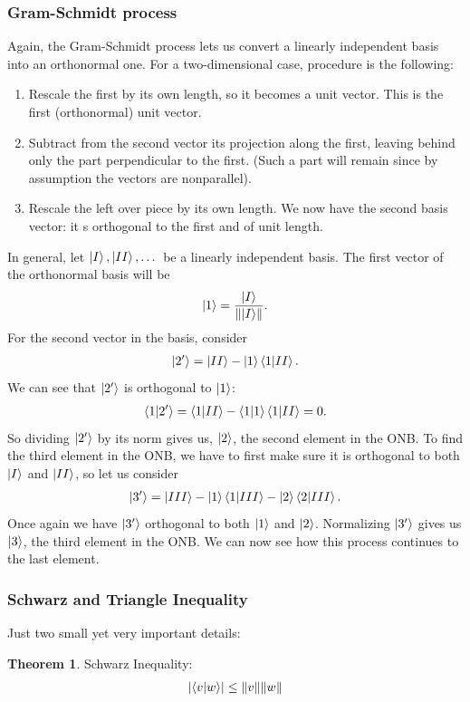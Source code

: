 \documentclass{book}
\theoremstyle{definition}
\newtheorem{thm}{Theorem}[section]
\newcommand{\f}[2]{\frac{#1}{#2}}
\begin{document}
\subsubsection{Gram-Schmidt process}
Again, the Gram-Schmidt process lets us convert a linearly independent basis into an orthonormal one. For a two-dimensional case, procedure is the following:
\begin{enumerate}
	\item Rescale the first by its own length, so it becomes a unit vector. This is the first (orthonormal) unit vector.
	\item Subtract from the second vector its projection along the first, leaving behind only the part perpendicular to the first. (Such a part will remain since by assumption the vectors are nonparallel).
	\item Rescale the left over piece by its own length. We now have the second basis vector: it s orthogonal to the first and of unit length.
\end{enumerate}

In general, let $\ket{I}, \ket{II}, \dots$ be a linearly independent basis. The first vector of the orthonormal basis will be
\begin{align}
\ket{1} = \f{\ket{I}}{\norm{\ket{I}}}.
\end{align}
For the second vector in the basis, consider
\begin{align}
\ket{2'} = \ket{II} - \ket{1}\braket{1}{II}.
\end{align}
We can see that $\ket{2'}$ is orthogonal to $\ket{1}$:
\begin{align}
\braket{1}{2'} = \braket{1}{II} - \braket{1}\braket{1}{II} = 0.
\end{align}
So dividing $\ket{2'}$ by its norm gives us, $\ket{2}$, the second element in the ONB. To find the third element in the ONB, we have to first make sure it is orthogonal to both $\ket{I}$ and $\ket{II}$, so let us consider
\begin{align}
\ket{3'}= \ket{III} - \ket{1}\braket{1}{III} - \ket{2}\braket{2}{III}.
\end{align}
Once again we have $\ket{3'}$ orthogonal to both $\ket{1}$ and $\ket{2}$. Normalizing $\ket{3'}$ gives us $\ket{3}$, the third element in the ONB. We can now see how this process continues to the last element. 



\subsubsection{Schwarz and Triangle Inequality}
Just two small yet very important details:
\begin{thm}
	Schwarz Inequality:
	\begin{align}
	\abs{\braket{v}{w}} \leq \norm{v}\norm{w}
	\end{align}
\end{thm}
\end{document}
